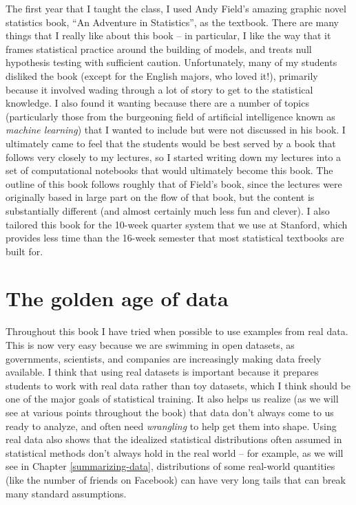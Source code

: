 \documentclass[12pt,]{book}
\theoremstyle{definition}
\theoremstyle{definition}
\theoremstyle{definition}
\theoremstyle{remark}
\begin{document}
The first year that I taught the class, I used Andy Field's amazing graphic novel statistics book, ``An Adventure in Statistics'', as the textbook. There are many things that I really like about this book -- in particular, I like the way that it frames statistical practice around the building of models, and treats null hypothesis testing with sufficient caution. Unfortunately, many of my students disliked the book (except for the English majors, who loved it!), primarily because it involved wading through a lot of story to get to the statistical knowledge. I also found it wanting because there are a number of topics (particularly those from the burgeoning field of artificial intelligence known as \emph{machine learning}) that I wanted to include but were not discussed in his book. I ultimately came to feel that the students would be best served by a book that follows very closely to my lectures, so I started writing down my lectures into a set of computational notebooks that would ultimately become this book. The outline of this book follows roughly that of Field's book, since the lectures were originally based in large part on the flow of that book, but the content is substantially different (and almost certainly much less fun and clever). I also tailored this book for the 10-week quarter system that we use at Stanford, which provides less time than the 16-week semester that most statistical textbooks are built for.

\hypertarget{the-golden-age-of-data}{%
\section{The golden age of data}\label{the-golden-age-of-data}}

Throughout this book I have tried when possible to use examples from real data. This is now very easy because we are swimming in open datasets, as governments, scientists, and companies are increasingly making data freely available. I think that using real datasets is important because it prepares students to work with real data rather than toy datasets, which I think should be one of the major goals of statistical training. It also helps us realize (as we will see at various points throughout the book) that data don't always come to us ready to analyze, and often need \emph{wrangling} to help get them into shape. Using real data also shows that the idealized statistical distributions often assumed in statistical methods don't always hold in the real world -- for example, as we will see in Chapter \ref{summarizing-data}, distributions of some real-world quantities (like the number of friends on Facebook) can have very long tails that can break many standard assumptions.
\end{document}
